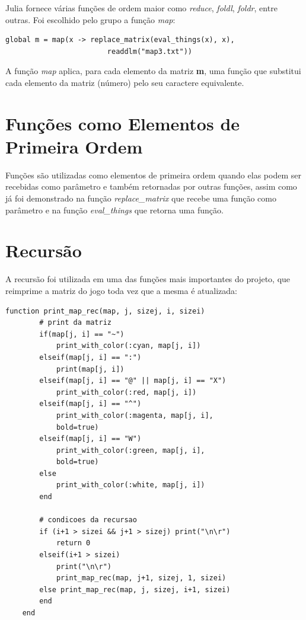 \documentclass[rel_mlp]{iiufrgs}
\begin{document}
    Julia fornece várias funções de ordem maior como \textit{reduce}, \textit{foldl}, \textit{foldr}, entre outras. Foi escolhido pelo grupo a função \textit{map}:
  
    \begin{lstlisting}[frame=single]
    global m = map(x -> replace_matrix(eval_things(x), x),
                        readdlm("map3.txt"))
    \end{lstlisting}
    
    A função \textit{map} aplica, para cada elemento da matriz \textbf{m}, uma função que substitui cada elemento da matriz (número) pelo seu caractere equivalente.
 
 \section{Funções como Elementos de Primeira Ordem}
 
    Funções são utilizadas como elementos de primeira ordem quando elas podem ser recebidas como parâmetro e também retornadas por outras funções, assim como já foi demonstrado na função \textit{replace\_matrix} que recebe uma função como parâmetro e na função \textit{eval\_things} que retorna uma função.
 
 \section{Recursão}
 
    A recursão foi utilizada em uma das funções mais importantes do projeto, que reimprime a matriz do jogo toda vez que a mesma é atualizada:
  
    \begin{lstlisting}[frame=single]
    function print_map_rec(map, j, sizej, i, sizei)
    	# print da matriz
    	if(map[j, i] == "~")
    	    print_with_color(:cyan, map[j, i])
    	elseif(map[j, i] == ":")			
    		print(map[j, i])
    	elseif(map[j, i] == "@" || map[j, i] == "X")
    		print_with_color(:red, map[j, i])
    	elseif(map[j, i] == "^")
    		print_with_color(:magenta, map[j, i],
    		bold=true)
    	elseif(map[j, i] == "W")
    		print_with_color(:green, map[j, i],
    		bold=true)
    	else
    		print_with_color(:white, map[j, i])
    	end
    
    	# condicoes da recursao
    	if (i+1 > sizei && j+1 > sizej) print("\n\r")
    	    return 0
    	elseif(i+1 > sizei)
    		print("\n\r")
    		print_map_rec(map, j+1, sizej, 1, sizei)
    	else print_map_rec(map, j, sizej, i+1, sizei)
    	end
    end
    \end{lstlisting}
    
\end{document}
